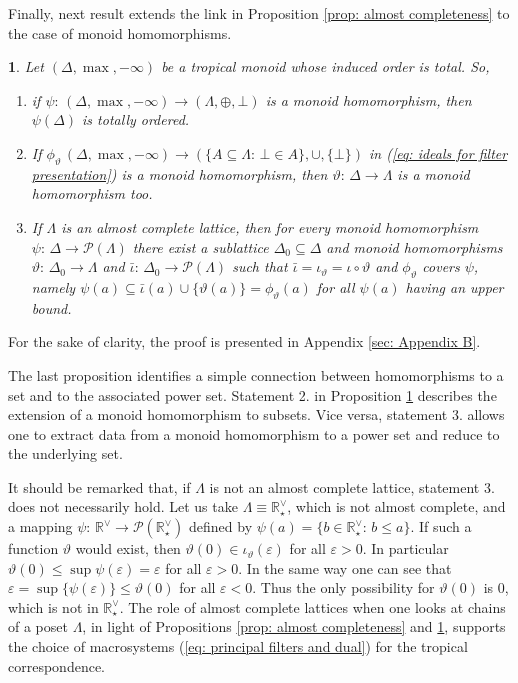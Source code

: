 \documentclass[11pt,british,reqno]{article}
\makeatletter
\numberwithin{equation}{section}
\numberwithin{figure}{section}
\numberwithin{table}{section}
\theoremstyle{definition}
\theoremstyle{definition}
\theoremstyle{plain}
\theoremstyle{plain}
\newtheorem{proposition}{\protect\propositionname}
\theoremstyle{remark}
\theoremstyle{plain}
\numberwithin{equation}{section}
\numberwithin{figure}{section}
\numberwithin{table}{section}
\theoremstyle{plain}
\renewenvironment{proof}[1][\proofname]{\par
  \pushQED{\qed}%
  \normalfont \topsep6\p@\@plus6\p@\relax
  \list{}{%
    \settowidth{\leftmargin}{\itshape\proofname:\hskip\labelsep}%
    \setlength{\labelwidth}{0pt}%
    \setlength{\itemindent}{-\leftmargin}%
  }%
  \item[\hskip\labelsep\itshape#1\@addpunct{:}]\ignorespaces
}{%
  \popQED\endlist\@endpefalse
}
\providecommand{\propositionname}{Proposition}
\makeatother
\begin{document}
Finally, next result extends the link in Proposition \ref{prop: almost completeness} to the case of monoid homomorphisms. 

\begin{proposition}
\label{prop: homomorphism totally ordered sets} Let $(\Delta,\max,-\infty)$
be a tropical monoid whose induced order is total. So, 
\begin{enumerate}
\item if $\psi:\,(\Delta,\max,-\infty)\longrightarrow(\Lambda,\oplus,\bot)$
is a monoid homomorphism, then $\psi(\Delta)$ is totally ordered. 
\item If $\phi_{\vartheta}\,(\Delta,\max,-\infty)\longrightarrow\left(\{A\subseteq\Lambda:\,\bot\in A\},\cup,\{\bot\}\right)$
in (\ref{eq: ideals for filter presentation}) is a monoid homomorphism,
then $\vartheta:\,\Delta\longrightarrow\Lambda$ is a monoid
homomorphism too. 
\item If $\Lambda$ is an almost complete lattice, then for every monoid
homomorphism $\psi:\,\Delta\longrightarrow\mathcal{P}(\Lambda)$
there exist a sublattice $\Delta_{0}\subseteq\Delta$ and monoid homomorphisms
$\vartheta:\,\Delta_{0}\longrightarrow\Lambda$ and $\bar{\iota}:\,\Delta_{0}\longrightarrow\mathcal{P}(\Lambda)$
such that $\bar{\iota}=\iota_{\vartheta}=\iota\circ\vartheta$ and $\phi_{\vartheta}$
covers $\psi$, namely $\psi(a)\subseteq\bar{\iota}(a)\cup\{\vartheta(a)\}=\phi_{\vartheta}(a)$ for all $\psi(a)$ having an upper bound. 
\end{enumerate}
\end{proposition}
\begin{proof}
For the sake of clarity, the proof is presented in Appendix \ref{sec: Appendix B}. 
\end{proof}

The last proposition identifies a simple connection between homomorphisms to a set and to  the associated power set. Statement 2. in Proposition \ref{prop: homomorphism totally ordered sets} describes the extension of a monoid homomorphism to subsets. Vice versa, statement 3. allows one to extract data from a monoid homomorphism to a power set and reduce to the underlying set. 

It should be remarked that, if $\Lambda$ is not an almost
complete lattice, statement 3. does not necessarily hold. Let us take $\Lambda\equiv\mathbb{R}_{\star}^{\vee}$, which is not almost complete, and a mapping $\psi:\,\mathbb{R}^{\vee}\longrightarrow\mathcal{P}(\mathbb{R}_{\star}^{\vee})$ defined by $\psi(a)=\{b\in\mathbb{R}_{\star}^{\vee}:\,b\leq a\}$.
If such a function $\vartheta$ would exist, then $\vartheta(0)\in\iota_{\vartheta}(\varepsilon)$
for all $\varepsilon>0$. In particular $\vartheta(0)\leq\sup\psi(\varepsilon)=\varepsilon$ for all $\varepsilon>0$. In the same way one can see that $\varepsilon=\sup\{\psi(\varepsilon)\}\leq\vartheta(0)$
for all $\varepsilon<0$. Thus the only possibility for $\vartheta(0)$
is $0$, which is not in $\mathbb{R}_{\star}^{\vee}$. The role of almost complete lattices when one looks at chains of a poset $\Lambda$, in light of Propositions \ref{prop: almost completeness} and \ref{prop: homomorphism totally ordered sets}, supports the choice of macrosystems (\ref{eq: principal filters and dual}) for the tropical correspondence. 
\end{document}
